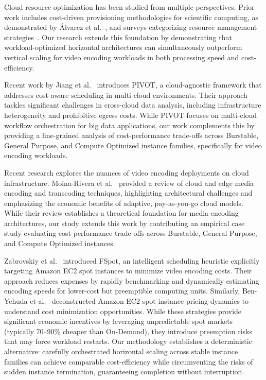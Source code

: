 \documentclass[conference]{IEEEtran}
\begin{document}
Cloud resource optimization has been studied from multiple perspectives. Prior
work includes cost-driven provisioning methodologies for scientific computing,
as demonstrated by Álvarez et al.~\cite{b2}, and surveys categorizing
resource management strategies~\cite{b4}. Our research extends this foundation
by demonstrating that workload-optimized horizontal architectures can
simultaneously outperform vertical scaling for video encoding workloads in both
processing speed and cost-efficiency.

Recent work by Jiang et al.~\cite{b20} introduces PIVOT, a
cloud-agnostic framework that addresses cost-aware scheduling in multi-cloud
environments. Their approach tackles significant challenges in cross-cloud data
analysis, including infrastructure heterogeneity and prohibitive egress costs.
While PIVOT focuses on multi-cloud workflow orchestration for big data
applications, our work complements this by providing a fine-grained analysis of
cost-performance trade-offs across Burstable, General Purpose, and Compute
Optimized instance families, specifically for video encoding workloads.

Recent research explores the nuances of video encoding deployments on cloud
infrastructure. Moina-Rivera et al.~\cite{b22} provided a review of
cloud and edge media encoding and transcoding techniques, highlighting
architectural challenges and emphasizing the economic benefits of adaptive,
pay-as-you-go cloud models. While their review establishes a theoretical
foundation for media encoding architectures, our study extends this work by
contributing an empirical case study evaluating cost-performance trade-offs
across Burstable, General Purpose, and Compute Optimized instances.

Zabrovskiy et al.~\cite{b21} introduced FSpot, an intelligent
scheduling heuristic explicitly targeting Amazon EC2 spot instances to minimize
video encoding costs. Their approach reduces expenses by rapidly benchmarking
and dynamically estimating encoding speeds for lower-cost but preemptible
computing units. Similarly, Ben-Yehuda et al.~\cite{b19} deconstructed Amazon EC2 spot instance pricing dynamics to understand cost minimization opportunities. While these
strategies provide significant economic incentives by leveraging unpredictable
spot markets (typically 70--90\% cheaper than On-Demand), they introduce
preemption risks that may force workload restarts. Our methodology establishes
a deterministic alternative: carefully orchestrated horizontal scaling across
stable instance families can achieve comparable cost-efficiency while
circumventing the risks of sudden instance termination, guaranteeing completion
without interruption.
\end{document}
